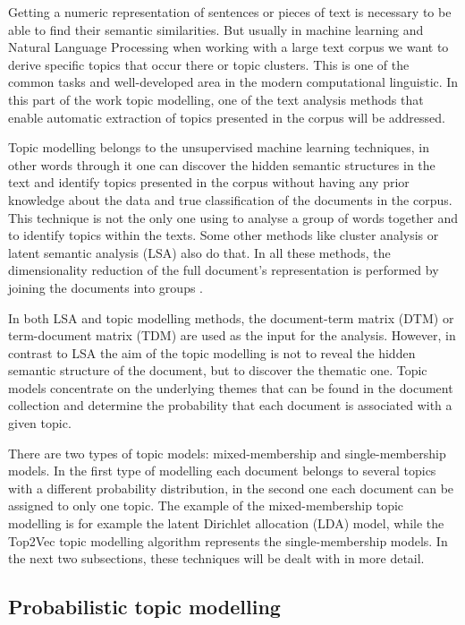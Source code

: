 \documentclass[fontsize=12pt,a4paper,twoside,openany]{scrbook}
\begin{document}
Getting a numeric representation of sentences or pieces of text is necessary to be able to find their semantic similarities. But usually in machine learning and Natural Language Processing when working with a large text corpus we want to derive specific topics that occur there or topic clusters. This is one of the common tasks and well-developed area in the modern computational linguistic. In this part of the work topic modelling, one of the text analysis methods that enable automatic extraction of topics presented in the corpus will be addressed.

Topic modelling belongs to the unsupervised machine learning techniques, in other words through it one can discover the hidden semantic structures in the text and identify topics presented in the corpus without having any prior knowledge about the data and true classification of the documents in the corpus. This technique is not the only one using to analyse a group of words together and to identify topics within the texts. Some other methods like cluster analysis or latent semantic analysis (LSA) \parencite[see][]{Foltz96, Landauer2007} also do that. In all these methods, the dimensionality reduction of the full document's representation is performed by joining the documents into groups \parencite{Anandarajan18}. 

In both LSA and topic modelling methods, the document-term matrix (DTM) or term-document matrix (TDM) are used as the input for the analysis. However, in contrast to LSA the aim of the topic modelling is not to reveal the hidden semantic structure of the document, but to discover the thematic one. Topic models concentrate on the underlying themes that can be found in the document collection and determine the probability that each document is associated with a given topic. 

There are two types of topic models: mixed-membership and single-membership models. In the first type of modelling each document belongs to several topics with a different probability distribution, in the second one each document can be assigned to only one topic. The example of the mixed-membership topic modelling is for example the latent Dirichlet allocation (LDA) model, while the Top2Vec topic modelling algorithm represents the single-membership models. In the next two subsections, these techniques will be dealt with in more detail.

\subsection{Probabilistic topic modelling}
\label{sec:lda}
\end{document}
